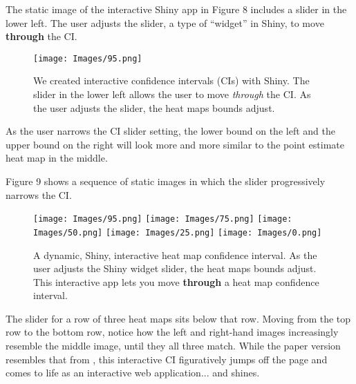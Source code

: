 The static image of the interactive Shiny app in Figure 8 includes a slider in the lower left. The user adjusts the slider, a type of ``widget'' in Shiny, to move {\bf through} the CI.

  \begin{figure}[H]
	\centering
	\texttt{[image: Images/95.png]}
	\caption{We created interactive confidence intervals (CIs) with Shiny. The slider in the lower left allows the user to move {\it through} the CI. As the user adjusts the slider, the heat maps bounds adjust.}
	\end{figure}

As the user narrows the CI slider setting, the lower bound on the left and the upper bound on the right will look more and more similar to the point estimate heat map in the middle.

Figure 9 shows a sequence of static images in which the slider progressively narrows the CI.
  \begin{figure}[H]
	\centering
	\texttt{[image: Images/95.png]}
	\texttt{[image: Images/75.png]}
	\texttt{[image: Images/50.png]}
	\texttt{[image: Images/25.png]}
	\texttt{[image: Images/0.png]}
	\caption{A dynamic, Shiny, interactive heat map confidence interval. As the user adjusts the Shiny widget slider, the heat maps bounds adjust. This interactive app lets you move {\bf through} a heat map confidence interval.}
	\end{figure}

The slider for a row of three heat maps sits below that row. Moving from the top row to the bottom row, notice how the left and right-hand images increasingly resemble the middle image, until they all three match. While the paper version resembles that from \cite{Cross2015}, this interactive CI figuratively jumps off the page and comes to life as an interactive web application... and shines.
